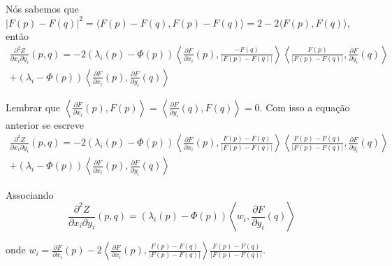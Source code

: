 \begin{demonstracao}
	Nós sabemos que $|F(p) - F(q)|^2 = \langle F(p) - F(q), F(p) - F(q) \rangle = 2 - 2 \langle F(p), F(q) \rangle$, então
	\begin{multline*}
		\frac{\partial^2 Z}{\partial x_i \partial y_i}(p,q) = -2 (\lambda_i(p) - \Phi(p)) \left\langle \frac{\partial F}{\partial x_i}(p), \frac{-F(q)}{|F(p) - F(q)|} \right\rangle \left\langle \frac{F(p)}{|F(p) - F(q)|}, \frac{\partial F}{\partial y_i}(q) \right\rangle\\
		+ (\lambda_i - \Phi(p)) \left\langle \frac{\partial F}{\partial x_i}(p), \frac{\partial F}{\partial y_i}(q) \right\rangle
	\end{multline*}
	
	Lembrar que $\left\langle \frac{\partial F}{\partial x_i}(p), F(p) \right\rangle = \left\langle \frac{\partial F}{\partial y_i}(q), F(q) \right\rangle = 0$. Com isso a equação anterior se escreve
	\begin{multline*}
	\frac{\partial^2 Z}{\partial x_i \partial y_i}(p,q) = -2 (\lambda_i(p) - \Phi(p)) \left\langle \frac{\partial F}{\partial x_i}(p), \frac{F(p) -F(q)}{|F(p) - F(q)|} \right\rangle \left\langle \frac{F(p) - F(q)}{|F(p) - F(q)|}, \frac{\partial F}{\partial y_i}(q) \right\rangle\\
	+ (\lambda_i - \Phi(p)) \left\langle \frac{\partial F}{\partial x_i}(p), \frac{\partial F}{\partial y_i}(q) \right\rangle
	\end{multline*}
	
	Associando
	\begin{equation*}
	\frac{\partial^2 Z}{\partial x_i \partial y_i}(p,q) = (\lambda_i(p) - \Phi(p))  \left\langle w_i , \frac{\partial F}{\partial y_i}(q) \right\rangle
	\end{equation*}
	
	onde $w_i = \frac{\partial F}{\partial x_i}(p)  -2 \left\langle \frac{\partial F}{\partial x_i}(p), \frac{F(p) -F(q)}{|F(p) - F(q)|} \right\rangle \frac{F(p) - F(q)}{|F(p) - F(q)|}$.
\end{demonstracao}


